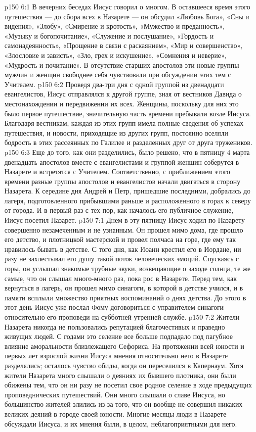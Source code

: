 \vs p150 6:1 В вечерних беседах Иисус говорил о многом. В оставшееся время этого путешествия --- до сбора всех в Назарете --- он обсудил «Любовь Бога», «Сны и видения», «Злобу», «Смирение и кротость», «Мужество и преданность», «Музыку и богопочитание», «Служение и послушание», «Гордость и самонадеянность», «Прощение в связи с раскаянием», «Мир и совершенство», «Злословие и зависть», «Зло, грех и искушение», «Сомнения и неверие», «Мудрость и почитание». В отсутствие старших апостолов эти новые группы мужчин и женщин свободнее себя чувствовали при обсуждении этих тем с Учителем.
\vs p150 6:2 Проведя два\hyp{}три дня с одной группой из двенадцати евангелистов, Иисус отправлялся к другой группе, зная от вестников Давида о местонахождении и передвижении их всех. Женщины, поскольку для них это было первое путешествие, значительную часть времени пребывали возле Иисуса. Благодаря вестникам, каждая из этих групп имела полные сведения об успехах путешествия, и новости, приходящие из других групп, постоянно вселяли бодрость в этих рассеянных по Галилее и разделенных друг от друга тружеников.
\vs p150 6:3 Еще до того, как они разделились, было решено, что в пятницу 4 марта двенадцать апостолов вместе с евангелистами и группой женщин соберутся в Назарете и встретятся с Учителем. Соответственно, с приближением этого времени разные группы апостолов и евангелистов начали двигаться в сторону Назарета. К середине дня Андрей и Петр, пришедшие последними, добрались до лагеря, подготовленного прибывшими раньше и расположенного в горах к северу от города. И в первый раз с тех пор, как началось его публичное служение, Иисус посетил Назарет.
\vs p150 7:1 Днем в эту пятницу Иисус ходил по Назарету совершенно незамеченным и не узнанным. Он прошел мимо дома, где прошло его детство, и плотницкой мастерской и провел полчаса на горе, где ему так нравилось бывать в детстве. С того дня, как Иоанн крестил его в Иордане, ни разу не захлестывал его душу такой поток человеческих эмоций. Спускаясь с горы, он услышал знакомые трубные звуки, возвещающие о заходе солнца, те же самые, что он слышал много\hyp{}много раз, пока рос в Назарете. Перед тем, как вернуться в лагерь, он прошел мимо синагоги, в которой в детстве учился, и в памяти всплыли множество приятных воспоминаний о днях детства. До этого в этот день Иисус уже послал Фому договориться с управителем синагоги относительно его проповеди на субботней утренней службе.
\vs p150 7:2 Жители Назарета никогда не пользовались репутацией благочестивых и праведно живущих людей. С годами это селение все больше подпадало под пагубное влияние аморальности близлежащего Сефориса. На протяжении всей юности и первых лет взрослой жизни Иисуса мнения относительно него в Назарете разделялись; осталось чувство обиды, когда он переселился в Капернаум. Хотя жители Назарета много слышали о деяниях их бывшего плотника, они были обижены тем, что он ни разу не посетил свое родное селение в ходе предыдущих проповеднических путешествий. Они много слышали о славе Иисуса, но большинство жителей злились из\hyp{}за того, что он вообще не совершил никаких великих деяний в городе своей юности. Многие месяцы люди в Назарете обсуждали Иисуса, и их мнения были, в целом, неблагоприятными для него.
